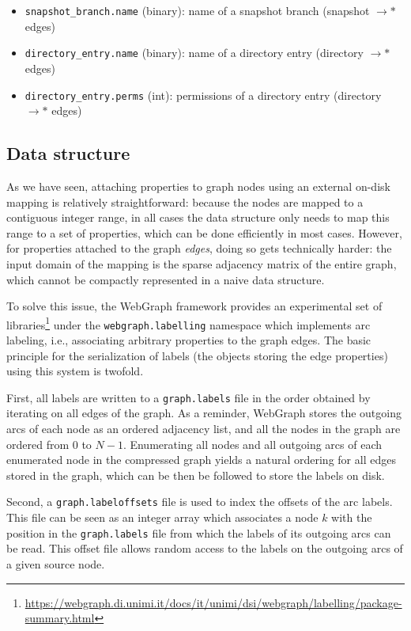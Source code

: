 \begin{itemize}
    \setlength\itemsep{0em}
\item \texttt{snapshot\_branch.name} (binary): name of a snapshot branch
    (snapshot $\to\ast$ edges)
\item \texttt{directory\_entry.name} (binary): name of a directory entry
    (directory $\to\ast$ edges)
\item \texttt{directory\_entry.perms} (int): permissions of a directory
    entry (directory $\to\ast$ edges)
\end{itemize}

\subsection{Data structure}%
\label{sec:label-data-structure}

As we have seen, attaching properties to graph nodes using an external
on-disk mapping is relatively straightforward: because the nodes are mapped to
a contiguous integer range, in all cases the data structure only needs to map
this range to a set of properties, which can be done efficiently in most cases.
However, for properties attached to the graph \emph{edges}, doing so gets
technically harder: the input domain of the mapping is the sparse adjacency
matrix of the entire graph, which cannot be compactly represented in a naive
data structure.

To solve this issue, the WebGraph framework provides an experimental set of
libraries\footnote{\url{https://webgraph.di.unimi.it/docs/it/unimi/dsi/webgraph/labelling/package-summary.html}}
under the \texttt{webgraph.labelling} namespace which implements arc labeling,
i.e., associating arbitrary properties to the graph edges. The basic principle
for the serialization of labels (the objects storing the edge properties) using
this system is twofold.

First, all labels are written to a \texttt{graph.labels} file in the order
obtained by iterating on all edges of the graph.  As a reminder, WebGraph
stores the outgoing arcs of each node as an ordered adjacency list, and all the
nodes in the graph are ordered from $0$ to $N-1$.  Enumerating all nodes
and all outgoing arcs of each enumerated node in the compressed graph
yields a natural ordering for all edges stored in the graph, which can be
then be followed to store the labels on disk.

Second, a \texttt{graph.labeloffsets} file is used to index the offsets of the
arc labels. This file can be seen as an integer array which associates a node
$k$ with the position in the \texttt{graph.labels} file from which the labels
of its outgoing arcs can be read. This offset file allows random access to the
labels on the outgoing arcs of a given source node.

